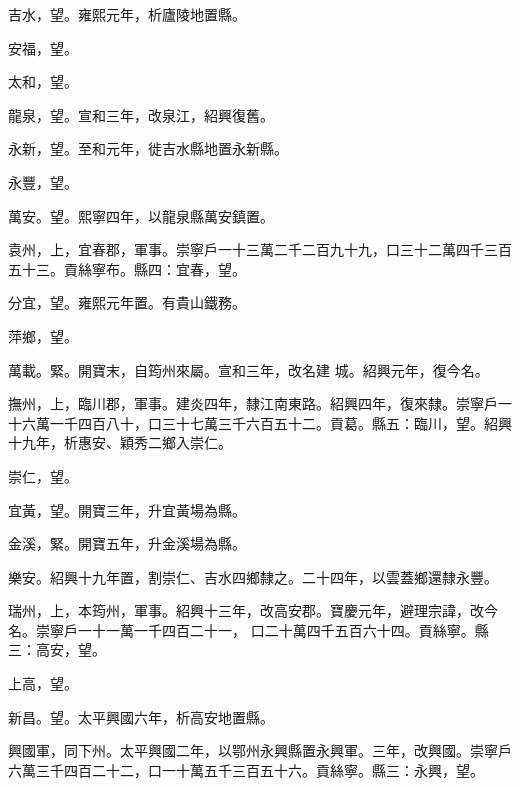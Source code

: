 \begin{pinyinscope}
 吉水，望。雍熙元年，析廬陵地置縣。



 安福，望。



 太和，望。



 龍泉，望。宣和三年，改泉江，紹興復舊。



 永新，望。至和元年，徙吉水縣地置永新縣。



 永豐，望。



 萬安。望。熙寧四年，以龍泉縣萬安鎮置。



 袁州，上，宜春郡，軍事。崇寧戶一十三萬二千二百九十九，口三十二萬四千三百五十三。貢絲寧布。縣四：宜春，望。



 分宜，望。雍熙元年置。有貴山鐵務。



 萍鄉，望。



 萬載。緊。開寶末，自筠州來屬。宣和三年，改名建
 城。紹興元年，復今名。



 撫州，上，臨川郡，軍事。建炎四年，隸江南東路。紹興四年，復來隸。崇寧戶一十六萬一千四百八十，口三十七萬三千六百五十二。貢葛。縣五：臨川，望。紹興十九年，析惠安、穎秀二鄉入崇仁。



 崇仁，望。



 宜黃，望。開寶三年，升宜黃場為縣。



 金溪，緊。開寶五年，升金溪場為縣。



 樂安。紹興十九年置，割崇仁、吉水四鄉隸之。二十四年，以雲蓋鄉還隸永豐。



 瑞州，上，本筠州，軍事。紹興十三年，改高安郡。寶慶元年，避理宗諱，改今名。崇寧戶一十一萬一千四百二十一，
 口二十萬四千五百六十四。貢絲寧。縣三：高安，望。



 上高，望。



 新昌。望。太平興國六年，析高安地置縣。



 興國軍，同下州。太平興國二年，以鄂州永興縣置永興軍。三年，改興國。崇寧戶六萬三千四百二十二，口一十萬五千三百五十六。貢絲寧。縣三：永興，望。




\end{pinyinscope}
